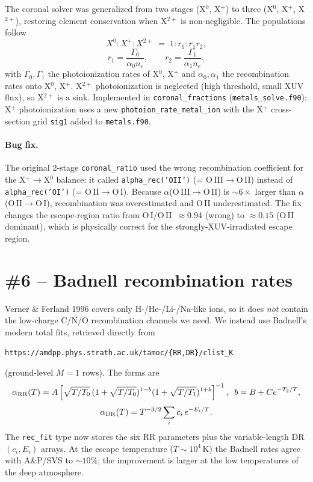 \documentclass[english,a4paper]{kiseon_memo}
\begin{document}
The coronal solver was generalized from two stages (X$^0$, X$^+$) to
three (X$^0$, X$^+$, X$^{2+}$), restoring element conservation when
X$^{2+}$ is non-negligible.  The populations follow
\[
  X^0 : X^+ : X^{2+} \;=\; 1 : r_1 : r_1 r_2,
\]
\[
  r_1 = \frac{\Gamma_0}{\alpha_0 n_e},\qquad
  r_2 = \frac{\Gamma_1}{\alpha_1 n_e},
\]
with $\Gamma_0,\Gamma_1$ the photoionization rates of X$^0$, X$^+$ and
$\alpha_0,\alpha_1$ the recombination rates onto X$^0$, X$^+$.
X$^{2+}$ photoionization is neglected (high threshold, small XUV flux),
so X$^{2+}$ is a sink.  Implemented in \texttt{coronal\_fractions}
(\texttt{metals\_solve.f90}); X$^+$ photoionization uses a new
\texttt{photoion\_rate\_metal\_ion} with the X$^+$ cross-section grid
\texttt{sig1} added to \texttt{metals.f90}.

\paragraph{Bug fix.}  The original 2-stage \texttt{coronal\_ratio} used
the wrong recombination coefficient for the X$^+\!\to$X$^0$ balance:
it called \texttt{alpha\_rec('OII')} (= O\,III$\to$O\,II) instead of
\texttt{alpha\_rec('OI')} (= O\,II$\to$O\,I).  Because $\alpha$(O\,III$\to$O\,II)
is $\sim 6\times$ larger than $\alpha$(O\,II$\to$O\,I), recombination was
overestimated and O\,II underestimated.  The fix changes the escape-region
ratio from O\,I/O\,II~$\approx 0.94$ (wrong) to $\approx 0.15$ (O\,II
dominant), which is physically correct for the strongly-XUV-irradiated
escape region.

\section{\#6 -- Badnell recombination rates}

Verner \& Ferland 1996 covers only H-/He-/Li-/Na-like ions, so it does
\emph{not} contain the low-charge C/N/O recombination channels we need.
We instead use Badnell's modern total fits, retrieved directly from
\begin{center}
\texttt{https://amdpp.phys.strath.ac.uk/tamoc/\{RR,DR\}/clist\_K}
\end{center}
(ground-level $M=1$ rows). The forms are
\[
  \alpha_{\rm RR}(T) = A\left[\sqrt{T/T_0}\,(1+\sqrt{T/T_0})^{1-b}
                       (1+\sqrt{T/T_1})^{1+b}\right]^{-1},
  \;\; b = B + C e^{-T_2/T},
\]
\[
  \alpha_{\rm DR}(T) = T^{-3/2}\sum_i c_i\, e^{-E_i/T}.
\]
The \texttt{rec\_fit} type now stores the six RR parameters plus the
variable-length DR $(c_i, E_i)$ arrays. At the escape temperature
($T\sim10^4$\,K) the Badnell rates agree with A\&P/SVS to $\sim10\%$;
the improvement is larger at the low temperatures of the deep atmosphere.
\end{document}
